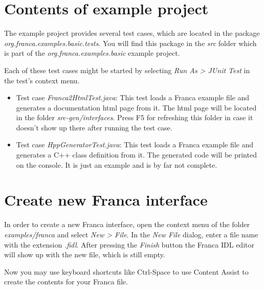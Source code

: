 \documentclass[a4paper,10pt]{scrreprt}
\newlength{\XdocItemIndent}
\begin{document}
\section{Contents of example project}
\label{GettingStarted_ExampleProject}
The example project provides several test cases, which are located in the package
\textit{org.franca.examples.basic.tests}. You will find this package in the \textit{src} folder
which is part of the \textit{org.franca.examples.basic} example project.

Each of these test cases might be started by selecting \textit{Run As > JUnit Test} in the
test's context menu.

\setlength{\XdocItemIndent}{\textwidth}
\begin{itemize}
\addtolength{\XdocItemIndent}{-2.5em}
\item \begin{minipage}[t]{\XdocItemIndent}
Test case \textit{Franca2HtmlTest.java}:
		This test loads a Franca example file and generates a documentation html page from it.
		The html page will be located in the folder \textit{src-gen/interfaces}.
		Press F5 for refreshing this folder in case it doesn't show up there after running
		the test case.  

\end{minipage}
\item \begin{minipage}[t]{\XdocItemIndent}
Test case \textit{HppGeneratorTest.java}:
		This test loads a Franca example file and generates a C++ class definition
		from it. The generated code will be printed on the console. It is just an
		example and is by far not complete.

\end{minipage}
\end{itemize}
\addtolength{\XdocItemIndent}{2.5em}

\section{Create new Franca interface}
\label{GettingStarted_CreateNewInterface}
In order to create a new Franca interface, open the context menu of the
folder \textit{examples/franca} and select \textit{New > File}. In the \textit{New File} dialog,
enter a file name with the extension \textit{.fidl}. After pressing the \textit{Finish} button
the Franca IDL editor will show up with the new file, which is still empty.

Now you may use keyboard shortcuts like Ctrl-Space to use Content Assist to create
the contents for your Franca file. 
\end{document}
